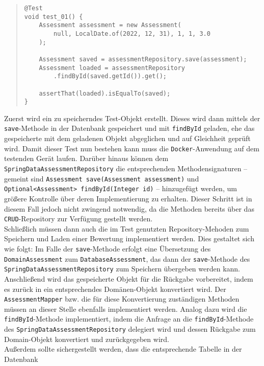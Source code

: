 \begin{quote}
\begin{verbatim}
@Test
void test_01() {
    Assessment assessment = new Assessment(
        null, LocalDate.of(2022, 12, 31), 1, 1, 3.0
    );

    Assessment saved = assessmentRepository.save(assessment);
    Assessment loaded = assessmentRepository
        .findById(saved.getId()).get();

    assertThat(loaded).isEqualTo(saved);
}
\end{verbatim}
\end{quote}

Zuerst wird ein zu speicherndes Test-Objekt erstellt. Dieses wird dann mittels der 
\texttt{save}-Methode in der Datenbank gespeichert und mit \texttt{findById} geladen, 
ehe das gespeicherte mit dem geladenen Objekt abgeglichen und auf Gleichheit geprüft 
wird. Damit dieser Test nun bestehen kann muss die \texttt{Docker}-Anwendung auf dem 
testenden Gerät laufen. Darüber hinaus können dem 
\texttt{SpringDataAssessmentRepository} die entsprechenden Methodensignaturen -- 
gemeint sind \texttt{Assessment save(Assessment assessment)} und 
\texttt{Optional<Assessment> findById(Integer id)} -- hinzugefügt werden, um größere 
Kontrolle über deren Implementierung zu erhalten. Dieser Schritt ist in diesem Fall 
jedoch nicht zwingend notwendig, da die Methoden bereits über das 
\texttt{CRUD}-Repository zur Verfügung gestellt werden. \\ 
Schließlich müssen dann auch die im Test genutzten Repository-Mehoden zum Speichern 
und Laden einer Bewertung implementiert werden. Dies gestaltet sich wie folgt: Im 
Falle der \texttt{save}-Methode erfolgt eine Übersetzung des \texttt{DomainAssessment} 
zum \texttt{DatabaseAssessment}, das dann der \texttt{save}-Methode des 
\texttt{SpringDataAssessmentRepository} zum Speichern übergeben werden kann. 
Anschließend wird das gespeicherte Objekt für die Rückgabe vorbereitet, indem es 
zurück in ein entsprechendes Domänen-Objekt konvertiert wird. Der 
\texttt{AssessmentMapper} bzw. die für diese Konvertierung zuständigen Methoden 
müssen an dieser Stelle ebenfalls implementiert werden. Analog dazu wird die 
\texttt{findById}-Methode implementiert, indem die Anfrage an die 
\texttt{findById}-Methode des \texttt{SpringDataAssessmentRepository} delegiert wird 
und dessen Rückgabe zum Domain-Objekt konvertiert und zurückgegeben wird. \\ 
Außerdem sollte sichergestellt werden, dass die entsprechende Tabelle in der Datenbank 

